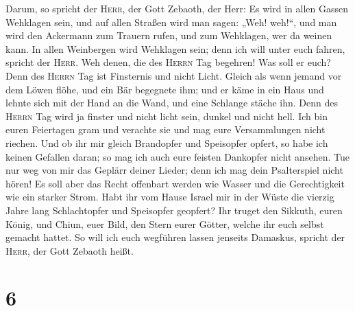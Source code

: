  Darum, so spricht der \textsc{Herr}, der Gott Zebaoth,
der Herr: Es wird in allen Gassen Wehklagen sein, und auf allen Straßen
wird man sagen: „Weh! weh!{}``, und man wird den Ackermann zum Trauern
rufen, und zum Wehklagen, wer da weinen kann.  In allen
Weinbergen wird Wehklagen sein; denn ich will unter euch fahren, spricht
der \textsc{Herr}.  Weh denen, die des \textsc{Herrn} Tag
begehren! Was soll er euch? Denn des \textsc{Herrn} Tag ist Finsternis
und nicht Licht.  Gleich als wenn jemand vor dem Löwen
flöhe, und ein Bär begegnete ihm; und er käme in ein Haus und lehnte
sich mit der Hand an die Wand, und eine Schlange stäche ihn.
 Denn des \textsc{Herrn} Tag wird ja finster und nicht
licht sein, dunkel und nicht hell.  Ich bin euren
Feiertagen gram und verachte sie und mag eure Versammlungen nicht
riechen.  Und ob ihr mir gleich Brandopfer und Speisopfer
opfert, so habe ich keinen Gefallen daran; so mag ich auch eure feisten
Dankopfer nicht ansehen.  Tue nur weg von mir das Geplärr
deiner Lieder; denn ich mag dein Psalterspiel nicht hören!
 Es soll aber das Recht offenbart werden wie Wasser und
die Gerechtigkeit wie ein starker Strom.  Habt ihr vom
Hause Israel mir in der Wüste die vierzig Jahre lang Schlachtopfer und
Speisopfer geopfert?  Ihr truget den Sikkuth, euren
König, und Chiun, euer Bild, den Stern eurer Götter, welche ihr euch
selbst gemacht hattet.  So will ich euch wegführen lassen
jenseits Damaskus, spricht der \textsc{Herr}, der Gott Zebaoth heißt.

\hypertarget{section-5}{%
\section{6}\label{section-5}}

